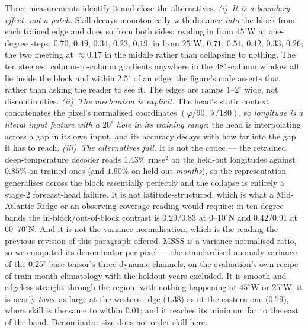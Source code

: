 \documentclass[10pt]{article}
\begin{document}
Three measurements identify it and close the alternatives. \emph{(i)~It
is a boundary effect, not a patch.} Skill decays monotonically with
distance \emph{into} the block from each trained edge and does so from
both sides: reading in from $45^\circ$W at one-degree steps, $0.70$,
$0.49$, $0.34$, $0.23$, $0.19$; in from $25^\circ$W, $0.71$, $0.54$,
$0.42$, $0.33$, $0.26$; the two meeting at $\approx0.17$ in the middle
rather than collapsing to nothing. The ten steepest column-to-column
gradients anywhere in the $481$-column window all lie inside the block
and within $2.5^\circ$ of an edge; the figure's code asserts that rather
than asking the reader to see it. The edges are ramps $1$--$2^\circ$
wide, not discontinuities. \emph{(ii)~The mechanism is explicit.} The
head's static context concatenates the pixel's normalised coordinates
$(\varphi/90,\ \lambda/180)$, so \emph{longitude is a literal input
feature with a $20^\circ$ hole in its training range}: the head is
interpolating across a gap in its own input, and its accuracy decays
with how far into the gap it has to reach. \emph{(iii)~The alternatives
fail.} It is not the codec --- the retrained deep-temperature
decoder reads $1.43\%$ rmse$^2$ on the held-out longitudes against
$0.85\%$ on trained ones (and $1.90\%$ on held-out \emph{months}), so
the representation generalises across the block essentially perfectly
and the collapse is entirely a stage-2 forecast-head failure. It is not
latitude-structured, which is what a Mid-Atlantic Ridge or an
observing-coverage reading would require: in ten-degree bands the
in-block/out-of-block contrast is $0.29/0.83$ at $0$--$10^\circ$N and
$0.42/0.91$ at $60$--$70^\circ$N. And it is not the variance
normalisation, which is the reading the previous revision of this
paragraph offered. MSSS is a variance-normalised ratio, so we computed
its denominator per pixel --- the standardised anomaly variance of the
$0.25^\circ$ base tensor's three dynamic channels, on the evaluation's
own recipe of train-month climatology with the holdout years excluded.
It is smooth and edgeless straight through the region, with nothing
happening at $45^\circ$W or $25^\circ$W; it is nearly \emph{twice} as
large at the western edge ($1.38$) as at the eastern one ($0.79$), where
skill is the same to within $0.01$; and it reaches its minimum far to
the east of the band. Denominator size does not order skill here.
\end{document}
